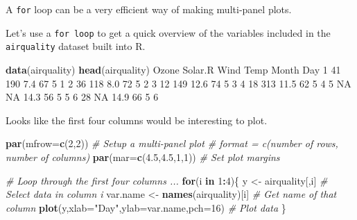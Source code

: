 \documentclass[]{book}
\newenvironment{Shaded}{\begin{snugshade}}{\end{snugshade}}
\newcommand{\CommentTok}[1]{\textcolor[rgb]{0.56,0.35,0.01}{\textit{#1}}}
\newcommand{\ControlFlowTok}[1]{\textcolor[rgb]{0.13,0.29,0.53}{\textbf{#1}}}
\newcommand{\DataTypeTok}[1]{\textcolor[rgb]{0.13,0.29,0.53}{#1}}
\newcommand{\DecValTok}[1]{\textcolor[rgb]{0.00,0.00,0.81}{#1}}
\newcommand{\FloatTok}[1]{\textcolor[rgb]{0.00,0.00,0.81}{#1}}
\newcommand{\KeywordTok}[1]{\textcolor[rgb]{0.13,0.29,0.53}{\textbf{#1}}}
\newcommand{\NormalTok}[1]{#1}
\newcommand{\OperatorTok}[1]{\textcolor[rgb]{0.81,0.36,0.00}{\textbf{#1}}}
\newcommand{\OtherTok}[1]{\textcolor[rgb]{0.56,0.35,0.01}{#1}}
\newcommand{\StringTok}[1]{\textcolor[rgb]{0.31,0.60,0.02}{#1}}
\begin{document}
A \texttt{for} loop can be a very efficient way of making multi-panel plots.

Let's use a \texttt{for\ loop} to get a quick overview of the variables included in the \texttt{airquality} dataset built into R.

\begin{Shaded}
\begin{Highlighting}[]
\KeywordTok{data}\NormalTok{(airquality)}
\KeywordTok{head}\NormalTok{(airquality)}
\NormalTok{  Ozone Solar.R Wind Temp Month Day}
\DecValTok{1}    \DecValTok{41}     \DecValTok{190}  \FloatTok{7.4}   \DecValTok{67}     \DecValTok{5}   \DecValTok{1}
\DecValTok{2}    \DecValTok{36}     \DecValTok{118}  \FloatTok{8.0}   \DecValTok{72}     \DecValTok{5}   \DecValTok{2}
\DecValTok{3}    \DecValTok{12}     \DecValTok{149} \FloatTok{12.6}   \DecValTok{74}     \DecValTok{5}   \DecValTok{3}
\DecValTok{4}    \DecValTok{18}     \DecValTok{313} \FloatTok{11.5}   \DecValTok{62}     \DecValTok{5}   \DecValTok{4}
\DecValTok{5}    \OtherTok{NA}      \OtherTok{NA} \FloatTok{14.3}   \DecValTok{56}     \DecValTok{5}   \DecValTok{5}
\DecValTok{6}    \DecValTok{28}      \OtherTok{NA} \FloatTok{14.9}   \DecValTok{66}     \DecValTok{5}   \DecValTok{6}
\end{Highlighting}
\end{Shaded}

Looks like the first four columns would be interesting to plot.

\begin{Shaded}
\begin{Highlighting}[]
\KeywordTok{par}\NormalTok{(}\DataTypeTok{mfrow=}\KeywordTok{c}\NormalTok{(}\DecValTok{2}\NormalTok{,}\DecValTok{2}\NormalTok{)) }\CommentTok{# Setup a multi-panel plot # format = c(number of rows, number of columns)}
\KeywordTok{par}\NormalTok{(}\DataTypeTok{mar=}\KeywordTok{c}\NormalTok{(}\FloatTok{4.5}\NormalTok{,}\FloatTok{4.5}\NormalTok{,}\DecValTok{1}\NormalTok{,}\DecValTok{1}\NormalTok{)) }\CommentTok{# Set plot margins}

\CommentTok{# Loop through the first four columns ...}
\ControlFlowTok{for}\NormalTok{(i }\ControlFlowTok{in} \DecValTok{1}\OperatorTok{:}\DecValTok{4}\NormalTok{)\{}
\NormalTok{  y <-}\StringTok{ }\NormalTok{airquality[,i] }\CommentTok{# Select data in column i}
\NormalTok{  var.name <-}\StringTok{ }\KeywordTok{names}\NormalTok{(airquality)[i] }\CommentTok{# Get name of that column}
  \KeywordTok{plot}\NormalTok{(y,}\DataTypeTok{xlab=}\StringTok{"Day"}\NormalTok{,}\DataTypeTok{ylab=}\NormalTok{var.name,}\DataTypeTok{pch=}\DecValTok{16}\NormalTok{) }\CommentTok{# Plot data}
\NormalTok{\}}
\end{Highlighting}
\end{Shaded}
\end{document}
